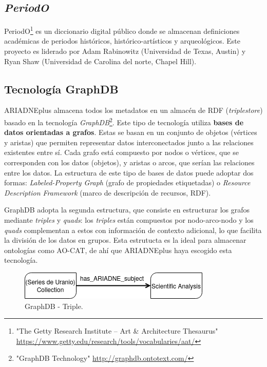 \documentclass[
]{article}
\begin{document}
\hypertarget{periodo}{%
\subsection{\texorpdfstring{\emph{PeriodO}}{PeriodO}}\label{periodo}}

PeriodO\footnote{"The Getty Research Institute -- Art \& Architecture
  Thesaurus"
  \url{https://www.getty.edu/research/tools/vocabularies/aat/}} es un
diccionario digital público donde se almacenan definiciones académicas
de periodos históricos, histórico-artísticos y arqueológicos. Este
proyecto es liderado por Adam Rabinowitz (Universidad de Texas, Austin)
y Ryan Shaw (Universidad de Carolina del norte, Chapel Hill).

\hypertarget{tecnologuxeda-graphdb}{%
\subsection{Tecnología GraphDB}\label{tecnologuxeda-graphdb}}

ARIADNEplus almacena todos los metadatos en un almacén de RDF
(\emph{triplestore}) basado en la tecnología \emph{GraphDB}\footnote{"GraphDB
  Technology" \url{http://graphdb.ontotext.com/}}. Este tipo de
tecnología utiliza \textbf{bases de datos orientadas a grafos}. Estas se
basan en un conjunto de objetos (vértices y aristas) que permiten
representar datos interconectados junto a las relaciones existentes
entre sí. Cada grafo está compuesto por nodos o vértices, que se
corresponden con los datos (objetos), y aristas o arcos, que serían las
relaciones entre los datos. La estructura de este tipo de bases de datos
puede adoptar dos formas: \emph{Labeled-Property Graph} (grafo de
propiedades etiquetadas) o \emph{Resource Description Framework} (marco
de descripción de recursos, RDF).

GraphDB adopta la segunda estructura, que consiste en estructurar los
grafos mediante \emph{triples} y \emph{quads}: los \emph{triples} están
compuestos por nodo-arco-nodo y los \emph{quads} complementan a estos
con información de contexto adicional, lo que facilita la división de
los datos en grupos. Esta estrutucta es la ideal para almacenar
ontologías como AO-CAT, de ahí que ARIADNEplus haya escogido esta
tecnología.

\begin{figure}
\hypertarget{triple}{%
\centering
\includegraphics{../_static/images/triple.png}
\caption{GraphDB - Triple.}\label{triple}
}
\end{figure}
\end{document}
